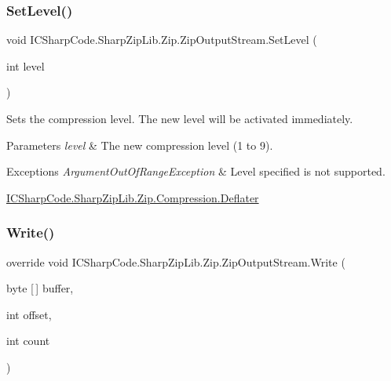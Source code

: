 \subsubsection{\texorpdfstring{Set\+Level()}{SetLevel()}}
{\footnotesize\ttfamily void I\+C\+Sharp\+Code.\+Sharp\+Zip\+Lib.\+Zip.\+Zip\+Output\+Stream.\+Set\+Level (\begin{DoxyParamCaption}\item[{int}]{level }\end{DoxyParamCaption})\hspace{0.3cm}{\ttfamily [inline]}}



Sets the compression level. The new level will be activated immediately. 


\begin{DoxyParams}{Parameters}
{\em level} & The new compression level (1 to 9).\\
\hline
\end{DoxyParams}

\begin{DoxyExceptions}{Exceptions}
{\em Argument\+Out\+Of\+Range\+Exception} & Level specified is not supported. \\
\hline
\end{DoxyExceptions}
\hyperlink{class_i_c_sharp_code_1_1_sharp_zip_lib_1_1_zip_1_1_compression_1_1_deflater}{I\+C\+Sharp\+Code.\+Sharp\+Zip\+Lib.\+Zip.\+Compression.\+Deflater} \mbox{\label{class_i_c_sharp_code_1_1_sharp_zip_lib_1_1_zip_1_1_zip_output_stream_a7534b9ce4f3ad0aa390b0dd4b8314c88}} 
\subsubsection{\texorpdfstring{Write()}{Write()}}
{\footnotesize\ttfamily override void I\+C\+Sharp\+Code.\+Sharp\+Zip\+Lib.\+Zip.\+Zip\+Output\+Stream.\+Write (\begin{DoxyParamCaption}\item[{byte \mbox{[}$\,$\mbox{]}}]{buffer,  }\item[{int}]{offset,  }\item[{int}]{count }\end{DoxyParamCaption})\hspace{0.3cm}{\ttfamily [inline]}}



